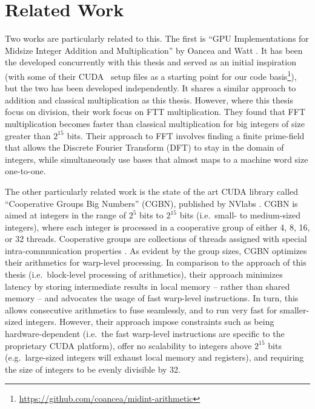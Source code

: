 \section{Related Work}
\label{sec:rel}

Two works are particularly related to this. The first is ``GPU Implementations
for Midsize Integer Addition and Multiplication'' by Oancea and Watt
\cite{oancea2024gpu}. It has been the developed concurrently with this thesis
and served as an initial inspiration (with some of their CUDA \cpp\ setup files
as a starting point for our code
basis\footnote{\url{https://github.com/coancea/midint-arithmetic}}), but the two
has been developed independently. It shares a similar approach to addition and
classical multiplication as this thesis. However, where this thesis focus on
division, their work focus on FTT multiplication. They found that FFT
multiplication becomes faster than classical multiplication for big integers of
size greater than $2^{15}$ bits. Their approach to FFT involves finding a finite
prime-field that allows the Discrete Fourier Transform (DFT) to stay in the
domain of integers, while simultaneously use bases that almost maps to a machine
word size one-to-one.

The other particularly related work is the state of the art CUDA library called
``Cooperative Groups Big Numbers'' (CGBN), published by NVlabs \cite{CGBN}. CGBN
is aimed at integers in the range of $2^5$ bits to $2^{15}$ bits (i.e.\ small-
to medium-sized integers), where each integer is processed in a cooperative
group of either 4, 8, 16, or 32 threads. Cooperative groups are collections of
threads assigned with special intra-communication properties
\cite{cudaguide}. As evident by the group sizes, CGBN optimizes their
arithmetics for warp-level processing.  In comparison to the approach of this
thesis (i.e.\ block-level processing of arithmetics), their approach minimizes
latency by storing intermediate results in local memory -- rather than shared
memory -- and advocates the usage of fast warp-level instructions. In turn, this
allows consecutive arithmetics to fuse seamlessly, and to run very fast for
smaller-sized integers. However, their approach impose constraints such as being
hardware-dependent (i.e.\ the fast warp-level instructions are specific to the
proprietary CUDA platform), offer no scalability to integers above $2^{15}$ bits
(e.g.\ large-sized integers will exhaust local memory and registers), and
requiring the size of integers to be evenly divisible by 32.

